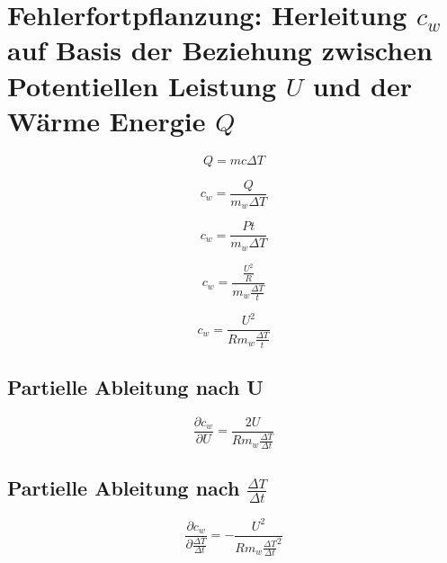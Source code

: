 \documentclass[10pt,a4paper]{article}
\begin{document}
\newpage
\thispagestyle{plain}
\tableofcontents
\newpage

\section{Fehlerfortpflanzung: Herleitung $c_w$ auf Basis der Beziehung zwischen Potentiellen Leistung $U$ und der Wärme Energie $Q$}
\begin{equation}
    Q = m c \Delta T
\end{equation}

\begin{equation}
    c_w = \frac{Q}{m_w \Delta T}
\end{equation}

\begin{equation}
    c_w = \frac{P t}{m_w \Delta T}
\end{equation}

\begin{equation}
    c_w = \frac{\frac{U^2}{R}}{m_w \frac{\Delta T}{t}}
\end{equation}

\begin{equation}
    c_w = \frac{U^2}{R m_w \frac{\Delta T}{t}}
\end{equation}

\subsection{Partielle Ableitung nach U}

\begin{equation}
    \frac{\partial c_w}{\partial U} = \frac{2 U}{R m_w \frac{\Delta T}{\Delta t}}
\end{equation}

\subsection{Partielle Ableitung nach $\frac{\Delta T}{\Delta t}$}

\begin{equation}
    \frac{\partial c_w}{\partial \frac{\Delta T}{\Delta t}} = - \frac{U^2}{R m_w \frac{\Delta T}{\Delta t}^2}
\end{equation}
\end{document}
